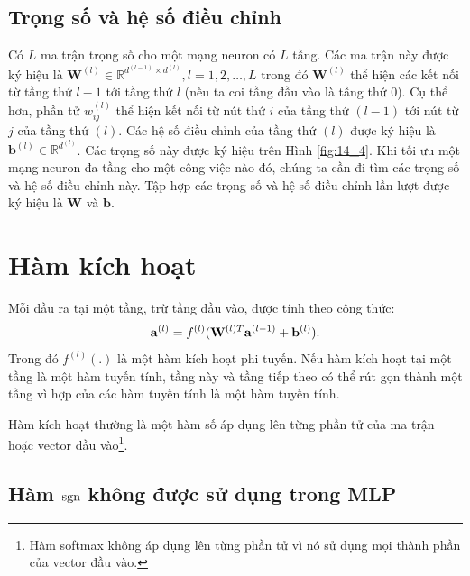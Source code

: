 \subsection{Trọng số và hệ số điều chỉnh}
Có $L$ ma trận trọng số cho một mạng neuron có $L$ tầng. Các ma
trận này được ký hiệu là $\mathbf{W}^{(l)} \in \mathbb{R}^{d^{(l-1)}\times
d^{(l)}}, l = 1, 2, \dots, L$ trong đó $\mathbf{W}^{(l)}$ thể hiện các
{kết nối} từ tầng thứ $l-1$ tới tầng thứ $l$ (nếu ta coi tầng đầu vào là
tầng thứ $0$). Cụ thể hơn, phần tử $w^{(l)}_{ij}$ thể hiện kết nối từ nút thứ
$i$ của tầng thứ $(l-1)$ tới nút từ $j$ của tầng thứ $(l)$. Các hệ số điều chỉnh của
tầng thứ $(l)$ được ký hiệu là $\mathbf{b}^{(l)} \in \mathbb{R}^{d^{(l)}}$. Các
trọng số này được ký hiệu trên Hình \ref{fig:14_4}. Khi tối ưu một
mạng neuron đa tầng cho một công việc nào đó, chúng ta cần đi tìm các
trọng số và hệ số điều chỉnh này. Tập hợp các trọng số và hệ số điều chỉnh lần lượt được ký hiệu là
$\mathbf{W}$ và $\mathbf{b}$.


\section{Hàm kích hoạt}


Mỗi đầu ra tại một tầng, trừ tầng đầu vào, được tính theo công thức:
\begin{equation}
\mathbf{a}^{(l)} = f^{(l)}(\mathbf{W}^{(l)T}\mathbf{a}^{(l-1)} + \mathbf{b}^{(l)}).
\end{equation}
Trong đó $f^{(l)}(.)$ là một hàm kích hoạt phi tuyến. Nếu hàm kích hoạt tại một
tầng là một hàm tuyến tính, tầng này và tầng tiếp theo có thể rút gọn thành
một tầng vì {hợp của các hàm tuyến tính là một hàm tuyến tính}.

Hàm kích hoạt thường là một hàm số áp dụng lên {từng phần tử} của ma trận
hoặc vector đầu vào\footnote{Hàm softmax không áp dụng lên từng phần tử vì nó sử dụng mọi thành phần của vector đầu vào.}.



\subsection{Hàm $\text{sgn}$ không được sử dụng trong MLP}

